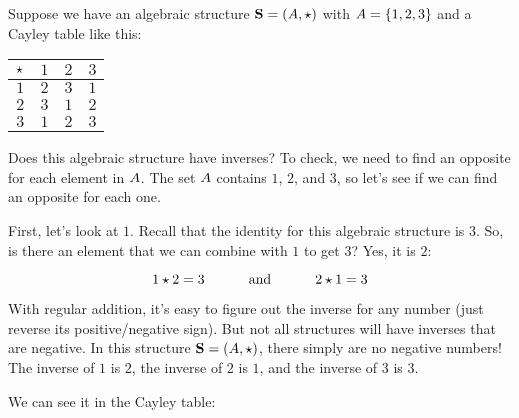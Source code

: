 \documentclass[../../../main.tex]{subfiles}
\begin{document}
\begin{example}

Suppose we have an algebraic structure $\algebra{S} = (\set{A}, \opSymbol/)$ with $A = \{ 1, 2, 3 \}$ and a Cayley table like this:

\begin{center}
  \begin{tabular}{| c || c | c | c | }
    \hline
    $\opSymbol/$ & $1$ & $2$ & $3$ \\ \hline \hline
    $1$          & $2$ & $3$ & $1$ \\ \hline
    $2$          & $3$ & $1$ & $2$ \\ \hline
    $3$          & $1$ & $2$ & $3$ \\ \hline
  \end{tabular}
\end{center}

Does this algebraic structure have inverses? To check, we need to find an opposite for each element in $A$. The set $A$ contains $1$, $2$, and $3$, so let's see if we can find an opposite for each one.

First, let's look at $1$. Recall that the identity for this algebraic structure is $3$. So, is there an element that we can combine with $1$ to get $3$? Yes, it is $2$:

\begin{equation*}
  \op{1}{2} = 3 \hskip 1cm \text{ and } \hskip 1cm \op{2}{1} = 3
\end{equation*}

\begin{aside}
  \begin{remark}
    With regular addition, it's easy to figure out the inverse for any number (just reverse its positive/negative sign). But not all structures will have inverses that are negative. In this structure $\algebra{S} = (\set{A}, \opSymbol/)$, there simply are no negative numbers! The inverse of $1$ is $2$, the inverse of $2$ is $1$, and the inverse of $3$ is $3$.
  \end{remark}
\end{aside}

We can see it in the Cayley table:


\end{example}
\end{document}
